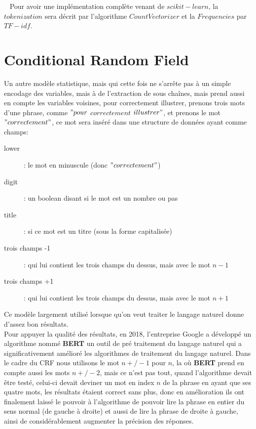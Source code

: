 \ \linebreak
Pour avoir une implémentation complète venant de $scikit-learn$, la $tokenization$ sera décrit par l'algorithme $CountVectorizer$ et la $Frequencies$ par $TF-idf$.\\
\pagebreak

\section{Conditional Random Field}
Un autre modèle statistique, mais qui cette fois ne s'arrête pas à un simple encodage des variables, mais à de l'extraction de sous chaînes, mais prend aussi en compte les variables voisines, pour correctement illustrer, prenons trois mots d'une phrase, comme $"pour$ $correctement$ $illustrer"$, et prenons le mot $"correctement"$, ce mot sera inséré dans une structure de données ayant comme champs:
\begin{description}
\item[lower]: le mot en minuscule (donc $"correctement"$)
\item[digit]: un boolean disant si le mot est un nombre ou pas
\item[title]: si ce mot est un titre (sous la forme capitalisée)
\item[trois champs -1]: qui lui contient les trois champs du dessus, mais avec le mot $n-1$ 
\item[trois champs +1]: qui lui contient les trois champs du dessus, mais avec le mot $n+1$ 
\end{description}

Ce modèle largement utilisé lorsque qu'on veut traiter le langage naturel donne d'assez bon résultats.\\
\linebreak
Pour appuyer la qualité des résultats, en 2018, l'entreprise Google a développé un algorithme nommé \textbf{BERT} un outil de pré traitement du langage naturel qui a significativement amélioré les algorithmes de traitement du langage naturel. Dans le cadre du CRF nous utilisons le mot $n+/-1$ pour $n$, la où \textbf{BERT} prend en compte aussi les mots $n+/-2$, mais ce n'est pas tout, quand l'algorithme devait être testé, celui-ci devait deviner un mot en index $n$ de la phrase en ayant que ses quatre mots, les résultats étaient correct sans plus, donc en amélioration ils ont finalement laissé le pouvoir à l'algorithme de pouvoir lire la phrase en entier du sens normal (de gauche à droite) et aussi de lire la phrase de droite à gauche, ainsi de considérablement augmenter la précision des réponses.

